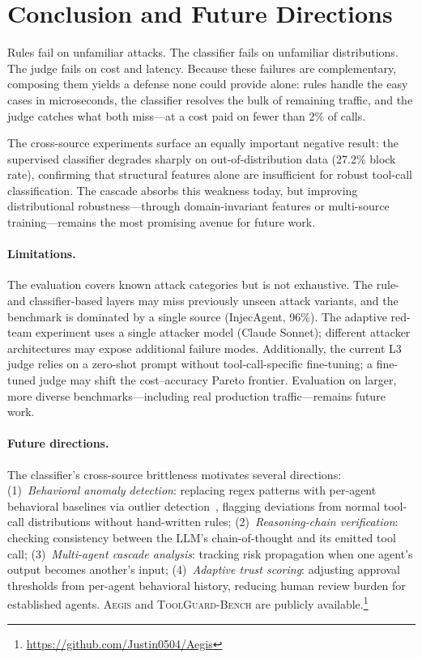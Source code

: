 \documentclass[sigconf]{acmart}
\newcommand{\system}{\textsc{Aegis}\xspace}
\newcommand{\bench}{\textsc{ToolGuard-Bench}\xspace}
\begin{document}


\section{Conclusion and Future Directions}

Rules fail on unfamiliar attacks. The classifier fails on unfamiliar distributions. The judge fails on cost and latency.
Because these failures are complementary, composing them yields a defense none could provide alone: rules handle the easy cases in microseconds, the classifier resolves the bulk of remaining traffic, and the judge catches what both miss---at a cost paid on fewer than 2\% of calls.

The cross-source experiments surface an equally important negative result: the supervised classifier degrades sharply on out-of-distribution data (27.2\% block rate), confirming that structural features alone are insufficient for robust tool-call classification.
The cascade absorbs this weakness today, but improving distributional robustness---through domain-invariant features or multi-source training---remains the most promising avenue for future work.

\paragraph{Limitations.}
The evaluation covers known attack categories but is not exhaustive.
The rule- and classifier-based layers may miss previously unseen attack variants, and the benchmark is dominated by a single source (InjecAgent, 96\%).
The adaptive red-team experiment uses a single attacker model (Claude Sonnet); different attacker architectures may expose additional failure modes.
Additionally, the current L3 judge relies on a zero-shot prompt without tool-call-specific fine-tuning; a fine-tuned judge may shift the cost--accuracy Pareto frontier.
Evaluation on larger, more diverse benchmarks---including real production traffic---remains future work.

\paragraph{Future directions.}
The classifier's cross-source brittleness motivates several directions:
(1)~\emph{Behavioral anomaly detection}: replacing regex patterns with per-agent behavioral baselines via outlier detection~\cite{zhao2019pyod}, flagging deviations from normal tool-call distributions without hand-written rules;
(2)~\emph{Reasoning-chain verification}: checking consistency between the LLM's chain-of-thought and its emitted tool call;
(3)~\emph{Multi-agent cascade analysis}: tracking risk propagation when one agent's output becomes another's input;
(4)~\emph{Adaptive trust scoring}: adjusting approval thresholds from per-agent behavioral history, reducing human review burden for established agents.
\system and \bench are publicly available.\footnote{\url{https://github.com/Justin0504/Aegis}}
\end{document}
